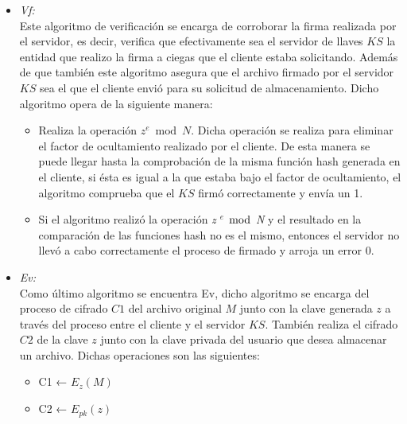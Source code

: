 \begin{itemize}
\item \textit{Vf: }\\

Este algoritmo de verificación se encarga de corroborar la firma realizada por el servidor, es decir, verifica que efectivamente sea el servidor de llaves $KS$ la entidad que realizo la firma a ciegas que el cliente estaba solicitando. Además de que también este algoritmo asegura que el archivo firmado por el servidor $KS$ sea el que el cliente envió para su solicitud de almacenamiento. 
Dicho algoritmo opera de la siguiente manera: 
\begin{itemize}
\item Realiza la operación $z^e \bmod N $. Dicha operación se realiza para eliminar el factor de ocultamiento realizado por el cliente. De esta manera se puede llegar hasta la comprobación de la misma función hash generada en el cliente, si ésta es igual a la que estaba bajo el factor de ocultamiento, el algoritmo comprueba que el $KS$ firmó correctamente y envía un 1. 
\item Si el algoritmo realizó la operación \textit{z $^e$ $\bmod$ N} y el resultado en la comparación de las funciones hash no es el mismo, entonces el servidor no llevó a cabo correctamente el proceso de firmado y arroja un error 0. 

\end{itemize}

\item \textit{Ev: }\\
Como último algoritmo se encuentra Ev, dicho algoritmo se encarga del proceso de cifrado $C1$ del archivo original $M$ junto con la clave generada $z$ a través del proceso entre el cliente y el servidor $KS$. También realiza el cifrado $C2$ de la clave $z$ junto con la clave privada del usuario que desea almacenar un archivo. Dichas operaciones son las siguientes: 

\begin{itemize}
\item C1 ← $E_{z}(M)$
\item C2 ← $E_{pk}(z)$
\end{itemize}


\end{itemize}

